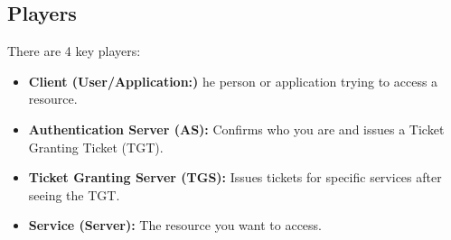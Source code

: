 \subsection{Players}
There are 4 key players:
\begin{itemize}
    \item \textbf{Client (User/Application:)} he person or application trying to access a resource.
    \item \textbf{Authentication Server (AS):} Confirms who you are and issues a Ticket Granting Ticket (TGT).
    \item \textbf{Ticket Granting Server (TGS):} Issues tickets for specific services after seeing the TGT.
    \item \textbf{Service (Server):} The resource you want to access. 
\end{itemize}

